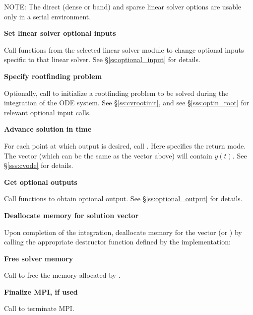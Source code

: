 \begin{Steps}


  
  
  
NOTE: The direct (dense or band) and sparse linear solver options are
usable only in a serial environment.

\item
  {\bf Set linear solver optional inputs}

  Call  functions from the selected linear solver module to
  change optional inputs specific to that linear solver.
  See \S\ref{ss:optional_input} for details.

\item
  {\bf Specify rootfinding problem}

  Optionally, call  to initialize a rootfinding problem
  to be solved during the integration of the ODE system.
  See \S\ref{ss:cvrootinit}, and see \S\ref{sss:optin_root} for
  relevant optional input calls.

\item
  {\bf Advance solution in time}

  For each point at which output is desired, call
  .
  Here  specifies the return mode.
  The vector  (which can be the same as
  the vector  above) will contain $y(t)$.
  See \S\ref{sss:cvode} for details.
  
\item
  {\bf Get optional outputs}

  Call  functions to obtain optional output.
  See \S\ref{ss:optional_output} for details.

\item
  {\bf Deallocate memory for solution vector}

  Upon completion of the integration, deallocate memory for the vector 
  (or ) by calling the appropriate destructor function defined by the
  {\nvector} implementation:


\item
  {\bf Free solver memory}

  Call  to free the memory allocated by {\cvodes}.
  
\item 
  {\bf Finalize MPI, if used}

  Call  to terminate MPI.
  
\end{Steps}

